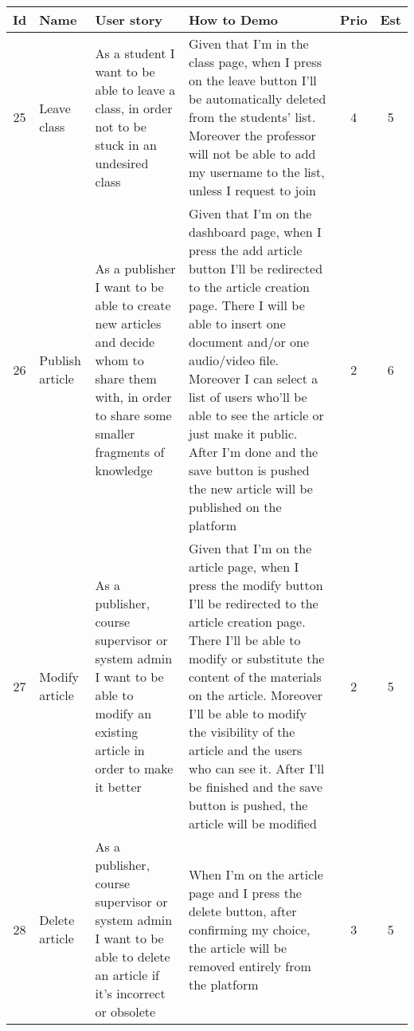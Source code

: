\newpage    
\begin{tabular}{|c|m{1.5cm}|m{4cm}|m{4cm}|c|c|}
	\hline
	\textbf{Id}&\textbf{Name}&\textbf{User story}&\textbf{How to Demo}&\textbf{Prio}&\textbf{Est}\\
	\hline
	25 & Leave class & 
	As a student I want to be able to leave a class, in order not to be stuck in an undesired class & 
	Given that I'm in the class page, when I press on the leave button I'll be automatically deleted from the students' list. Moreover the professor will not be able to add my username to the list, unless I request to join &
	4 & 5 \\
	\hline
	26 & Publish article & 
	As a publisher I want to be able to create new articles and decide whom to share them with, in order to share some smaller fragments of knowledge & 
	Given that I'm on the dashboard page, when I press the add article button I'll be redirected to the article creation page. There I will be able to insert one document and/or one audio/video file. Moreover I can select a list of users who'll be able to see the article or just make it public. After I'm done and the save button is pushed the new article will be published on the platform &
	2 & 6 \\
	\hline
	27 & Modify article & 
	As a publisher, course supervisor or system admin I want to be able to modify an existing article in order to make it better & 
	Given that I'm on the article page, when I press the modify button I'll be redirected to the article creation page. There I'll be able to modify or substitute the content of the materials on the article. Moreover I'll be able to modify the visibility of the article and the users who can see it. After I’ll be finished and the save button is pushed, the article will be modified &
	2 & 5 \\
	\hline
	28 & Delete article & 
	As a publisher, course supervisor or system admin I want to be able to delete an article if it's incorrect or obsolete & 
	When I'm on the article page and I press the delete button, after confirming my choice, the article will be removed entirely from the platform &
	3 & 5 \\
	\hline
\end{tabular}    
\newpage    
